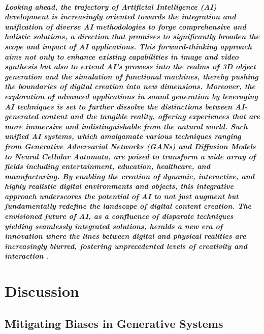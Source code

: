 \documentclass[11pt,a4paper,oneside]{report}
\begin{document}
\paragraph{Looking ahead, the trajectory of Artificial Intelligence (AI) development is increasingly oriented towards the integration and unification of diverse AI methodologies to forge comprehensive and holistic solutions, a direction that promises to significantly broaden the scope and impact of AI applications. This forward-thinking approach aims not only to enhance existing capabilities in image and video synthesis but also to extend AI's prowess into the realms of 3D object generation and the simulation of functional machines, thereby pushing the boundaries of digital creation into new dimensions. Moreover, the exploration of advanced applications in sound generation by leveraging AI techniques is set to further dissolve the distinctions between AI-generated content and the tangible reality, offering experiences that are more immersive and indistinguishable from the natural world. Such unified AI systems, which amalgamate various techniques ranging from Generative Adversarial Networks (GANs) and Diffusion Models to Neural Cellular Automata, are poised to transform a wide array of fields including entertainment, education, healthcare, and manufacturing. By enabling the creation of dynamic, interactive, and highly realistic digital environments and objects, this integrative approach underscores the potential of AI to not just augment but fundamentally redefine the landscape of digital content creation. The envisioned future of AI, as a confluence of disparate techniques yielding seamlessly integrated solutions, heralds a new era of innovation where the lines between digital and physical realities are increasingly blurred, fostering unprecedented levels of creativity and interaction \cite{esser2022towards}.}

\chapter{Discussion}
\label{discussion}

\section{Mitigating Biases in Generative Systems}
\end{document}
